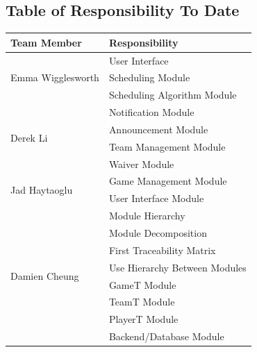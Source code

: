\documentclass[12pt, titlepage]{article}
\begin{document}
\subsection*{Table of Responsibility To Date}

\begin{center}
  \begin{tabular}{| p{} | p{} |}
    \hline
    Team Member & Responsibility                    \\
    \toprule

    \multirow{3}{0.3\textwidth}{Emma Wigglesworth}
                & User Interface                    \\
                & Scheduling Module                 \\
                & Scheduling Algorithm Module       \\

    \midrule

    \multirow{4}{0.3\textwidth}{Derek Li}
                & Notification Module               \\
                & Announcement Module               \\
                & Team Management Module            \\
                & Waiver Module                     \\

    \midrule

    \multirow{2}{0.3\textwidth}{Jad Haytaoglu}
                & Game Management Module            \\
                & User Interface Module             \\

    \midrule

    \multirow{8}{0.3\textwidth}{Damien Cheung}
                & Module Hierarchy                  \\
                & Module Decomposition              \\
                & First Traceability Matrix         \\
                & Use Hierarchy Between Modules     \\
                & GameT Module                      \\
                & TeamT Module                      \\
                & PlayerT Module                    \\
                & Backend/Database Module           \\


\end{tabular}
\end{center}
\end{document}
